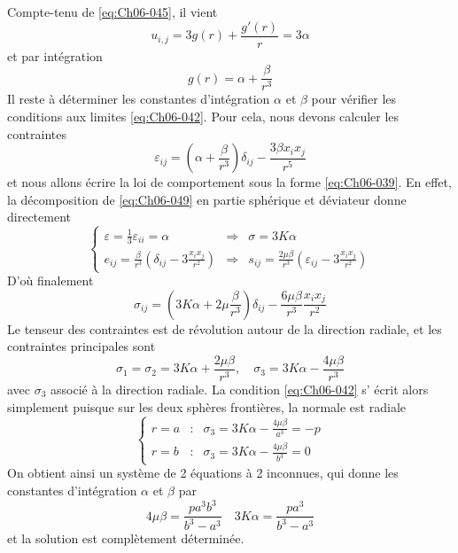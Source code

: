 Compte-tenu de \eqref{eq:Ch06-045}, il vient
\begin{equation}
    u_{i,j} = 3 g(r) + \frac{g'(r)}{r} = 3 \alpha
    \label{eq:Ch06-047}
\end{equation}
et par intégration
\begin{equation}
    g(r) = \alpha + \frac{\beta}{r^3}
    \label{eq:Ch06-048}
\end{equation}
Il reste à déterminer les constantes d'intégration $\alpha$ et $\beta$ pour vérifier les conditions aux limites \eqref{eq:Ch06-042}.
Pour cela, nous devons calculer les contraintes
\begin{equation}
    \varepsilon_{ij} = \left( \alpha + \frac{\beta}{r^3} \right)\delta_{ij} - \frac{3\beta x_i x_j}{r^5}
    \label{eq:Ch06-048}
\end{equation}
et nous allons écrire la loi de comportement sous la forme \eqref{eq:Ch06-039}.
En effet, la décomposition de \eqref{eq:Ch06-049} en partie sphérique et déviateur donne directement
\begin{equation}
    \left\{
    \begin{aligned}
        \varepsilon = \frac{1}{3} \varepsilon_{ii} = \alpha & \Rightarrow & \sigma = 3K  \alpha \\
        e_{ij} = \frac{\beta}{r^3} \left( \delta_{ij} - 3 \frac{x_ix_j}{r^2} \right) & \Rightarrow & s_{ij} = \frac{2\mu\beta}{r^3} \left( \varepsilon_{ij} - 3 \frac{x_i x_j}{r^2} \right)
    \end{aligned}
    \right.
    \label{eq:Ch06-050}
\end{equation}
D'où finalement
\begin{equation}
    \sigma_{ij} = \left( 3K\alpha + 2\mu \frac{\beta}{r^3} \right) \delta_{ij} - \frac{6\mu\beta}{r^3} \frac{x_ix_j}{r^2}
    \label{eq:Ch06-051}
\end{equation}
Le tenseur des contraintes est de révolution autour de la direction radiale, et les contraintes principales sont
\begin{equation}
    \sigma_1 = \sigma_2 = 3 K \alpha + \frac{2\mu\beta}{r^3}, \quad \sigma_3 = 3 K \alpha - \frac{4\mu\beta}{r^3}
    \label{eq:Ch06-052}
\end{equation}
avec $\sigma_3$ associé à la direction radiale.
La condition \eqref{eq:Ch06-042} s' écrit alors simplement puisque sur les deux sphères frontières, la normale est radiale
\begin{equation}
    \left\{
    \begin{aligned}
        r=a & : & \sigma_3 = 3K\alpha - \frac{4\mu\beta}{a^3} = -p \\
        r=b & : & \sigma_3 = 3K\alpha - \frac{4\mu\beta}{b^3} = 0
    \end{aligned}
    \right.
    \label{eq:Ch06-053}
\end{equation}
On obtient ainsi un système de 2 équations à 2 inconnues, qui donne les constantes d'intégration $\alpha$ et $\beta$ par
\begin{equation}
    4\mu\beta = \frac{pa^3b^3}{b^3-a^3} \quad 3K\alpha = \frac{p a^3}{b^3-a^3}
    \label{eq:Ch06-054}
\end{equation}
et la solution est complètement déterminée.


